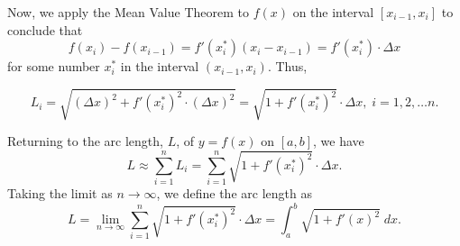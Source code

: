 \documentclass{ximera}
\begin{document}
Now, we apply the Mean Value Theorem to $f(x)$ on the interval $[x_{i-1}, x_i]$ to conclude that
\[
f(x_i) -f(x_{i-1})  = f'(x_i^*)(x_i - x_{i-1}) = f'(x_i^*) \cdot \Delta x
\]
for some number $x_i^*$ in the interval $(x_{i -1}, x_i)$. Thus,

\[
L_i = \sqrt{ (\Delta x)^2 + f'(x_i^*)^2 \cdot (\Delta x)^2} = \sqrt{ 1 + f'(x_i^*)^2 }\cdot \Delta x, \; i = 1, 2, \ldots n.
\]

Returning to the arc length, $L$, of $ y = f(x)$ on $[a,b]$, we have
\[
L \approx \sum_{i=1}^n L_i = \sum_{i=1}^n   \sqrt{1 + f'(x_i^*)^2} \cdot \Delta x.
\]
Taking the limit as $n \to \infty$, we define the arc length as 
\[
L = \lim_{n \to \infty} \sum_{i=1}^n   \sqrt{1 + f'(x_i^*)^2} \cdot \Delta x = \int_a^b \sqrt{1 + f'(x)^2} \; dx.
\]
\end{document}
